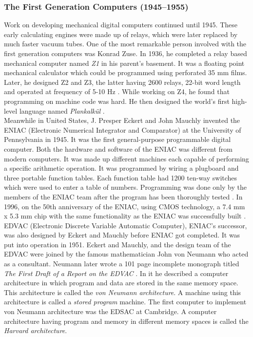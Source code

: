 \subsubsection{The First Generation Computers (1945--1955)}
Work on developing mechanical digital computers continued until 1945. These early calculating engines were made up of relays, which were later replaced by much faster vacuum tubes. One of the most remarkable person involved with the first generation computers was Konrad Zuse. In 1936, he completed a relay based mechanical computer named \textit{Z1} in his parent's basement. It was a floating point mechanical calculator which could be programmed using perforated 35 mm films. Later, he designed Z2 and Z3, the latter having 2600 relays, 22-bit word length and operated at frequency of 5-10 Hz \cite{morelli2001dalle}. While working on Z4, he found that programming on machine code was hard. He then designed the world's first high-level language named \textit{Plankalkül} \cite{hellige2013geschichten}.\\
Meanwhile in United States, J. Presper Eckert and John Mauchly invented the ENIAC (Electronic Numerical Integrator and Comparator) at the University of Pennsylvania in 1945. It was the first general-purpose programmable digital computer. Both the hardware and software of the ENIAC was different from modern computers. It was made up different machines each capable of performing a specific arithmetic operation. It was programmed by wiring a plugboard and three portable function tables. Each function table had 1200 ten-way switches which were used to enter a table of numbers. Programming was done only by the members of the ENIAC team after the program has been thoroughly tested \cite{cruz2013eniac}. In 1996, on the 50th anniversary of the ENIAC, using CMOS technology, a 7.4 mm x 5.3 mm chip with the same functionality as the ENIAC was successfully built \cite{6302808}.\\
EDVAC (Electronic Discrete Variable Automatic Computer), ENIAC's successor, was also designed by Eckert and Mauchly before ENIAC got completed. It was put into operation in 1951. Eckert and Mauchly, and the design team of the EDVAC were joined by the famous mathematician John von Neumann who acted as a consultant. Neumann later wrote a 101 page incomplete monograph titled \textit{The First Draft of a Report on the EDVAC} \cite{von1993first}. In it he described a computer architecture in which program and data are stored in the same memory space. This architecture is called the \textit{von Neumann architecture}. A machine using this architecture is called a \textit{stored program} machine. The first computer to implement von Neumann architecture was the EDSAC at Cambridge. A computer architecture having program and memory in different memory spaces is called the \textit{Harvard architecture}.\\ 
